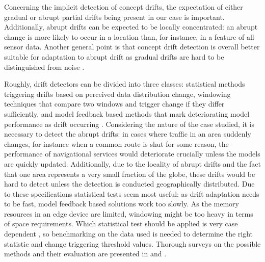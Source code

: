 




Concerning the implicit detection of concept drifts, the expectation of either gradual or abrupt partial drifts being present in our case is important. Additionally, abrupt drifts can be expected to be locally concentrated: an abrupt change is more likely to occur in a location than, for instance, in a feature of all sensor data. Another general point is that concept drift detection is overall better suitable for adaptation to abrupt drift as gradual drifts are hard to be distinguished from noise \cite{zliobaiteLearningConceptDrift2010}. 

Roughly, drift detectors can be divided into three classes: statistical methods triggering drifts based on perceived data distribution change, windowing techniques that compare two windows and trigger change if they differ sufficiently, and model feedback based methods that mark deteriorating model performance as drift occurring \cite{faithfullUnsupervisedChangeDetection2018}. Considering the nature of the case studied, it is necessary to detect the abrupt drifts: in cases where traffic in an area suddenly changes, for instance when a common route is shut for some reason, the performance of navigational services would deteriorate crucially unless the models are quickly updated. Additionally, due to the locality of abrupt drifts and the fact that one area represents a very small fraction of the globe, these drifts would be hard to detect unless the detection is conducted geographically distributed. Due to these specifications statistical tests seem most useful: as drift adaptation needs to be fast, model feedback based solutions work too slowly. As the memory resources in an edge device are limited, windowing might be too heavy in terms of space requirements. Which statistical test should be applied is very case dependent \cite{faithfullUnsupervisedChangeDetection2018}, so benchmarking on the data used is needed to determine the right statistic and change triggering threshold values. Thorough surveys on the possible methods and their evaluation are presented in \cite{conceptdriftsurvey} and \cite{faithfullUnsupervisedChangeDetection2018}.

